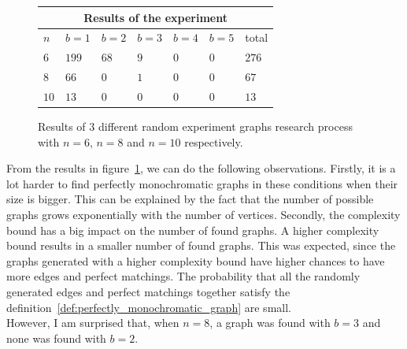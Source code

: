 \begin{figure}[H]
    \centering
    \begin{tabular}{ |p{1cm}||p{2cm}|p{2cm}|p{2cm}|p{2cm}|p{2cm}|p{2cm}|  }
        \hline
        \multicolumn{7}{|c|}{Results of the experiment} \\
        \hline
        $n$ & $b = 1$ & $b = 2$ & $b = 3$ & $b = 4$ & $b = 5$ & total \\
        \hline
        $6 $ & $199$ & $68$ & $9$ & $0$ & $0$ & $276$ \\
        $8 $ & $66$  & $0$  & $1$ & $0$ & $0$ & $67$   \\
        $10$ & $13$  & $0$  & $0$ & $0$ & $0$ & $13$  \\
        \hline
    \end{tabular}
    \caption{Results of $3$ different random experiment graphs research process with $n=6$, $n=8$ and $n=10$ respectively.}
    \label{fig:results-experiment}
\end{figure}

From the results in figure~\ref{fig:results-experiment}, we can do the following observations.
Firstly, it is a lot harder to find perfectly monochromatic graphs in these conditions when their size is bigger.
This can be explained by the fact that the number of possible graphs grows exponentially with the number of vertices.
Secondly, the complexity bound has a big impact on the number of found graphs.
A higher complexity bound results in a smaller number of found graphs.
This was expected, since the graphs generated with a higher complexity bound have higher chances to have more edges and perfect matchings.
The probability that all the randomly generated edges and perfect matchings together satisfy the definition~\ref{def:perfectly_monochromatic_graph} are small.\\

However, I am surprised that, when $n=8$, a graph was found with $b=3$ and none was found with $b=2$.
